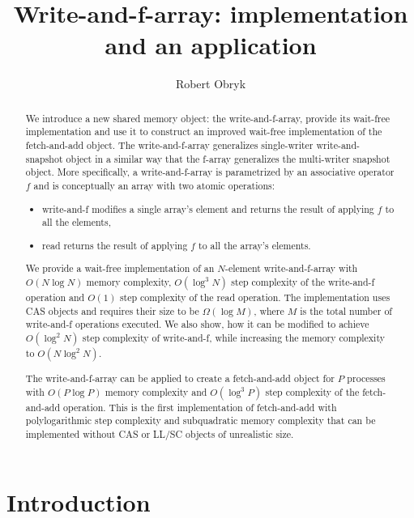 \documentclass[a4paper,11pt]{article}
\author{Robert Obryk}
\title{Write-and-f-array: implementation and an application}
\date{}
\begin{document}
\maketitle
\begin{abstract}
	We introduce a new shared memory object: the write-and-f-array, provide its wait-free implementation and use it to construct an improved wait-free implementation of the fetch-and-add object. The write-and-f-array generalizes single-writer write-and-snapshot\cite{write-and-snap} object in a similar way that the f-array\cite{f-array} generalizes the multi-writer snapshot object. More specifically, a write-and-f-array is parametrized by an associative operator $f$ and is conceptually an array with two atomic operations:

\begin{itemize}
\item write-and-f modifies a single array's element and returns the result of applying $f$ to all the elements,
\item read returns the result of applying $f$ to all the array's elements.
\end{itemize}

We provide a wait-free implementation of an $N$-element write-and-f-array with $O(N \log N)$ memory complexity, $O(\log^3 N)$ step complexity of the write-and-f operation and $O(1)$ step complexity of the read operation. The implementation uses CAS objects and requires their size to be $\Omega(\log M)$, where $M$ is the total number of write-and-f operations executed. We also show, how it can be modified to achieve $O(\log^2 N)$ step complexity of write-and-f, while increasing the memory complexity to $O(N \log^2 N)$.

The write-and-f-array can be applied to create a fetch-and-add object for $P$ processes with $O(P \log P)$ memory complexity and $O(\log^3 P)$ step complexity of the fetch-and-add operation. This is the first implementation of fetch-and-add with polylogarithmic step complexity and subquadratic memory complexity that can be implemented without CAS or LL/SC objects of unrealistic size\cite{ellen-fai}.
\end{abstract}
\clearpage
\tableofcontents
\clearpage
\section{Introduction}
\end{document}
